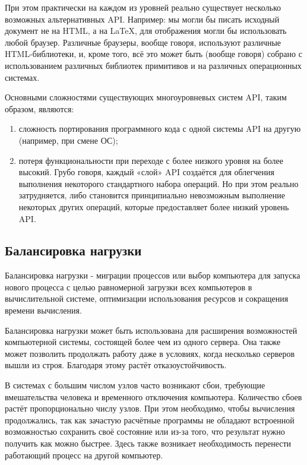 При этом практически на каждом из уровней реально существует несколько возможных альтернативных API. Например: мы могли бы писать исходный документ не на HTML, а на LaTeX, для отображения могли бы использовать любой браузер. Различные браузеры, вообще говоря, используют различные HTML-библиотеки, и, кроме того, всё это может быть (вообще говоря) собрано с использованием различных библиотек примитивов и на различных операционных системах.

Основными сложностями существующих многоуровневых систем API, таким образом, являются:
\begin{enumerate}
    \item сложность портирования программного кода с одной системы API на другую (например, при смене ОС);
    \item потеря функциональности при переходе с более низкого уровня на более высокий. Грубо говоря, каждый «слой» API создаётся для облегчения выполнения некоторого стандартного набора операций. Но при этом реально затрудняется, либо становится принципиально невозможным выполнение некоторых других операций, которые предоставляет более низкий уровень API.
\end{enumerate}



\subsection{Балансировка нагрузки}

Балансировка нагрузки  - миграции процессов или выбор компьютера для запуска нового процесса с целью равномерной загрузки всех компьютеров в вычислительной системе, оптимизации использования ресурсов и сокращения времени вычисления.

Балансировка нагрузки может быть использована для расширения возможностей компьютерной системы, состоящей более чем из одного сервера. Она также может позволить продолжать работу даже в условиях, когда несколько серверов вышли из строя. Благодаря этому растёт отказоустойчивость.

В системах с большим числом узлов часто возникают сбои, требующие вмешательства человека и временного отключения компьютера. Количество сбоев растёт пропорционально числу узлов. При этом необходимо, чтобы вычисления продолжались, так как зачастую расчётные программы не обладают встроенной возможностью сохранить своё состояние или из-за того, что результат нужно получить как можно быстрее. Здесь также возникает необходимость перенести работающий процесс на другой компьютер.


